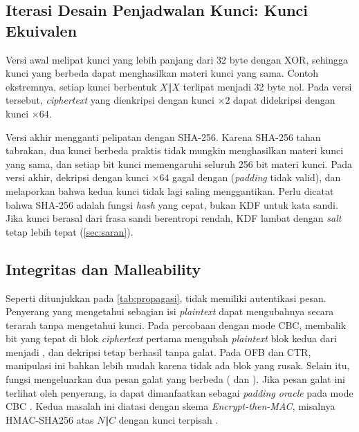 \subsection{Iterasi Desain Penjadwalan Kunci: Kunci Ekuivalen}
Versi awal melipat kunci yang lebih panjang dari 32 byte dengan XOR, sehingga kunci yang berbeda dapat menghasilkan materi kunci yang sama. Contoh ekstremnya, setiap kunci berbentuk $X \Vert X$ terlipat menjadi 32 byte nol. Pada versi tersebut, \textit{ciphertext} yang dienkripsi dengan kunci  $\times 2$ dapat didekripsi dengan kunci  $\times 64$.

Versi akhir mengganti pelipatan dengan SHA-256. Karena SHA-256 tahan tabrakan, dua kunci berbeda praktis tidak mungkin menghasilkan materi kunci yang sama, dan setiap bit kunci memengaruhi seluruh 256 bit materi kunci. Pada versi akhir, dekripsi dengan kunci  $\times 64$ gagal dengan  (\textit{padding} tidak valid), dan  melaporkan bahwa kedua kunci tidak lagi saling menggantikan. Perlu dicatat bahwa SHA-256 adalah fungsi \textit{hash} yang cepat, bukan KDF untuk kata sandi. Jika kunci berasal dari frasa sandi berentropi rendah, KDF lambat dengan \textit{salt} tetap lebih tepat (\cref{sec:saran}).

\subsection{Integritas dan Malleability}
\label{sec:integritas-keamanan}
Seperti ditunjukkan pada \cref{tab:propagasi}, \algname{} tidak memiliki autentikasi pesan. Penyerang yang mengetahui sebagian isi \textit{plaintext} dapat mengubahnya secara terarah tanpa mengetahui kunci. Pada percobaan dengan mode CBC, membalik bit yang tepat di blok \textit{ciphertext} pertama mengubah \textit{plaintext} blok kedua dari  menjadi , dan dekripsi tetap berhasil tanpa galat. Pada OFB dan CTR, manipulasi ini bahkan lebih mudah karena tidak ada blok yang rusak. Selain itu, fungsi  mengeluarkan dua pesan galat yang berbeda ( dan ). Jika pesan galat ini terlihat oleh penyerang, ia dapat dimanfaatkan sebagai \textit{padding oracle} pada mode CBC \cite{vaudenay2002}. Kedua masalah ini diatasi dengan skema \textit{Encrypt-then-MAC}, misalnya HMAC-SHA256 atas $N \Vert C$ dengan kunci terpisah \cite{bellare2000, rfc2104}.

